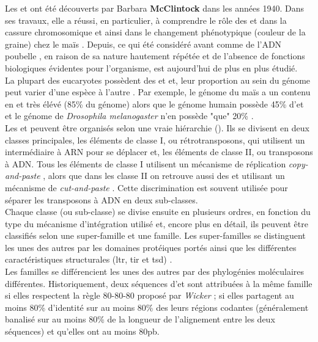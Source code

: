 \documentclass[10pt]{article}
\begin{document}
\bigskip

Les \acrlong{et} ont été découverts par Barbara \textbf{McClintock} dans les années 1940. Dans ses travaux, elle a réussi, en particulier, à comprendre le rôle des \acrshort{et} dans la cassure chromosomique et ainsi dans le changement phénotypique (couleur de la graine) chez le maïs \cite{mcclintock_origin_1950}. Depuis, ce qui été considéré avant comme de l'ADN \og poubelle \fg{}, en raison de sa nature hautement répétée  et de l'absence de fonctions biologiques évidentes pour l'organisme, est aujourd'hui de plus en plus étudié. \\
La plupart des eucaryotes possèdent des \acrlong{et} et, leur proportion au sein du génome peut varier d'une espèce à l'autre \cite{wells_field_2020}. Par exemple, le génome du maïs a un contenu en \acrshort{et} très élévé (85\% du génome) \cite{schnable_b73_2009} alors que le génome humain possède 45\% d'\acrshort{et} \cite{lander_initial_2001}  et le génome de \textit{Drosophila melanogaster} n'en possède "que" 20\% \cite{mccullers_transposable_2017}. \\
Les \acrshort{et} peuvent être organisés selon une vraie hiérarchie \cite{wicker} (\figureautorefname{ \ref{fig:classif_et}}). Ils se divisent en deux classes principales, les éléments de classe I, ou rétrotransposons, qui utilisent un intermédiaire à ARN pour se déplacer et, les éléments de classe II, ou transposons à ADN. Tous les éléments de classe I utilisent un mécanisme de réplication \textit{ \og copy-and-paste \fg{}}, alors que dans les classe II on retrouve aussi des \acrshort{et} utilisant un mécanisme de \textit{\og cut-and-paste \fg{}}. Cette discrimination est souvent utilisée pour séparer les transposons à ADN en deux sub-classes. \\
Chaque classe (ou sub-classe) se divise ensuite en plusieurs ordres, en fonction du type du mécanisme d'intégration utilisé et, encore plus en détail, ils peuvent être classifiés selon une super-famille et une famille. Les super-familles se distinguent les unes des autres par les domaines protéiques portés ainsi que les différentes caractéristiques structurales (\acrfull{ltr}, \acrfull{tir} et \acrfull{tsd}) \cite{bourque_ten_2018}. \\
Les familles se différencient les unes des autres par des phylogénies moléculaires différentes. Historiquement, deux séquences d'\acrshort{et} sont attribuées à la même famille si elles respectent la règle 80-80-80 proposé par \textit{Wicker} \cite{wicker}; si elles partagent au moins 80\% d'identité sur au moins 80\% des leurs régions codantes (généralement \og banalisé \fg{} sur au moins 80\% de la longueur de l'alignement entre les deux séquences) et qu'elles ont au moins 80pb.
\end{document}
